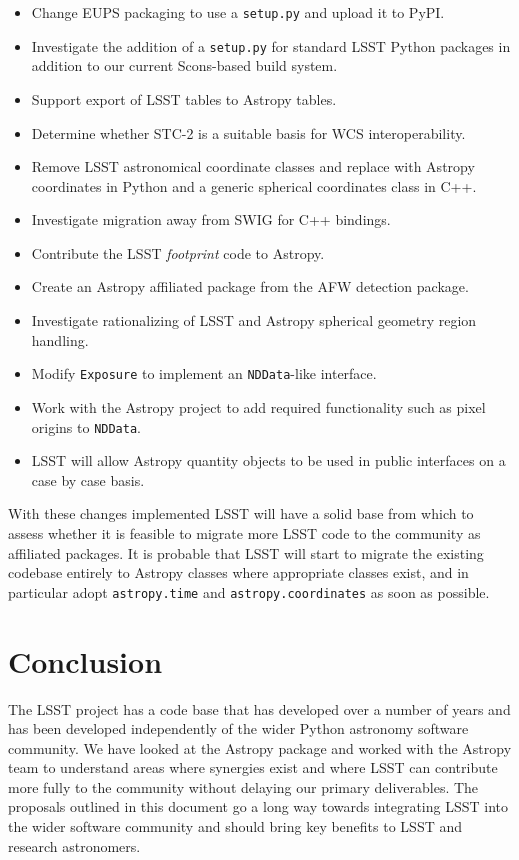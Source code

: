 \documentclass[]{spie}  %
\begin{document}
\begin{itemize}
\item Change EUPS packaging to use a \texttt{setup.py} and upload it to PyPI.
\item Investigate the addition of a \texttt{setup.py} for standard LSST Python packages in addition to our current Scons-based build system.
\item Support export of LSST tables to Astropy tables.
\item Determine whether STC-2 is a suitable basis for WCS interoperability.
\item Remove LSST astronomical coordinate classes and replace with Astropy coordinates in Python and a generic spherical coordinates class in C++.
\item Investigate migration away from SWIG for C++ bindings.
\item Contribute the LSST \emph{footprint} code to Astropy.
\item Create an Astropy affiliated package from the AFW detection package.
\item Investigate rationalizing of LSST and Astropy spherical geometry region handling.
\item Modify \texttt{Exposure} to implement an \texttt{NDData}-like interface.
\item Work with the Astropy project to add required functionality such as pixel origins to \texttt{NDData}.
\item LSST will allow Astropy quantity objects to be used in public interfaces on a case by case basis.

\end{itemize}

With these changes implemented LSST will have a solid base from which to assess whether it is feasible to migrate more LSST code to the community as affiliated packages.
It is probable that LSST will start to migrate the existing codebase entirely to Astropy classes where appropriate classes exist, and in particular adopt \texttt{astropy.time} and \texttt{astropy.coordinates} as soon as possible.

\section{Conclusion}

The LSST project has a code base that has developed over a number of years and has been developed independently of the wider Python astronomy software community.
We have looked at the Astropy package and worked with the Astropy team to understand areas where synergies exist and where LSST can contribute more fully to the community without delaying our primary deliverables.
The proposals outlined in this document go a long way towards integrating LSST into the wider software community and should bring key benefits to LSST and research astronomers.
\end{document}
